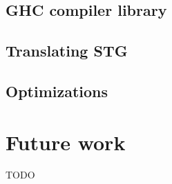 \documentclass[en]{pracamgr}
\begin{document}
\section{GHC compiler library}

\section{Translating STG}

\section{Optimizations}

\chapter{Future work}\label{r:future}

TODO
\end{document}
